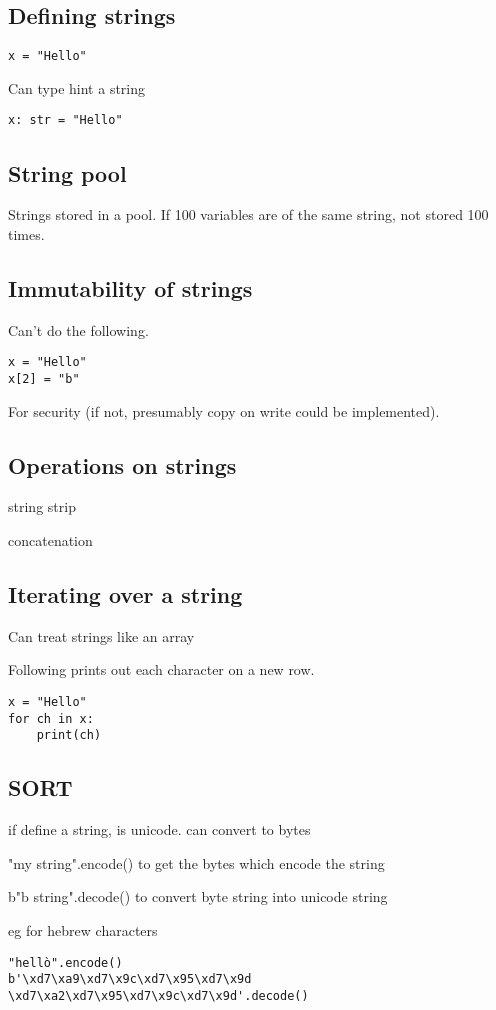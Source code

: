 
\subsection{Defining strings}

\begin{verbatim}
x = "Hello"
\end{verbatim}

Can type hint a string
\begin{verbatim}
x: str = "Hello"
\end{verbatim}


\subsection{String pool}

Strings stored in a pool. If 100 variables are of the same string, not stored 100 times.

\subsection{Immutability of strings}

Can't do the following.

\begin{verbatim}
x = "Hello"
x[2] = "b"
\end{verbatim}

For security (if not, presumably copy on write could be implemented).

\subsection{Operations on strings}
string strip

concatenation

\subsection{Iterating over a string}

Can treat strings like an array

Following prints out each character on a new row.

\begin{verbatim}
x = "Hello"
for ch in x:
    print(ch)
\end{verbatim}

\subsection{SORT}

if define a string, is unicode.
can convert to bytes

"my string".encode() to get the bytes which encode the string

b"b string".decode() to convert byte string into unicode string

eg for hebrew characters
\begin{verbatim}
"hellò".encode()
b'\xd7\xa9\xd7\x9c\xd7\x95\xd7\x9d \xd7\xa2\xd7\x95\xd7\x9c\xd7\x9d'.decode()
\end{verbatim}

